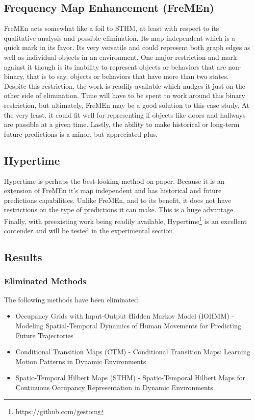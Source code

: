   \subsection { Frequency Map Enhancement (FreMEn) }
  FreMEn acts somewhat like a foil to STHM, at least with respect to its
  qualitative analysis and possible elimination. Its map independent which is
  a quick mark in its favor. Its very versatile and could represent both graph
  edges as well as individual objects in an environment. One major restriction
  and mark against it though is its inability to represent objects or behaviors
  that are non-binary, that is to say, objects or behaviors that have more than
  two states. Despite this restriction, the work is readily available which
  nudges it just on the other side of elimination. Time will have to be spent
  to work around this binary restriction, but ultimately, FreMEn may be a good
  solution to this case study. At the very least, it could fit well for
  representing if objects like doors and hallways are passible at a given time.
  Lastly, the ability to make historical or long-term future predictions is
  a minor, but appreciated plus. \\

  \subsection { Hypertime }
  Hypertime is perhaps the best-looking method on paper. Because it is an
  extension of FreMEn it's map independent
  and has historical and future predictions capabilities. Unlike FreMEn, and to its benefit, it does not have
  restrictions on the type of predictions it can make. This is
  a huge advantage. Finally, with preexisting work being readily available,
  Hypertime\footnote[1]{https://github.com/gestom}
  is an excellent contender and will be tested in the experimental section. \\

  \subsection{ Results }
  \subsubsection{ Eliminated Methods }
  The following methods have been eliminated:
  \begin{itemize}
    \item Occupancy Grids with Input-Output Hidden Markov Model (IOHMM) - Modeling Spatial-Temporal Dynamics of Human Movements for Predicting Future Trajectories \cite{Wang2015}
    \item Conditional Transition Maps (CTM) - Conditional Transition Maps: Learning Motion Patterns in Dynamic Environments \cite{Kucner2013}
    \item Spatio-Temporal Hilbert Maps (STHM) - Spatio-Temporal Hilbert Maps for Continuous Occupancy Representation in Dynamic Environments \cite{Senanayake2016}
  \end{itemize}

